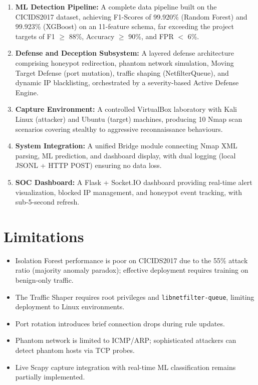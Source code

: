 \documentclass[12pt,a4paper]{report}
\begin{document}
\begin{enumerate}
    \item \textbf{ML Detection Pipeline:} A complete data pipeline built on the CICIDS2017 dataset, achieving F1-Scores of 99.920\% (Random Forest) and 99.923\% (XGBoost) on an 11-feature schema, far exceeding the project targets of F1 $\geq$ 88\%, Accuracy $\geq$ 90\%, and FPR $<$ 6\%.
    \item \textbf{Defense and Deception Subsystem:} A layered defense architecture comprising honeypot redirection, phantom network simulation, Moving Target Defense (port mutation), traffic shaping (NetfilterQueue), and dynamic IP blacklisting, orchestrated by a severity-based Active Defense Engine.
    \item \textbf{Capture Environment:} A controlled VirtualBox laboratory with Kali Linux (attacker) and Ubuntu (target) machines, producing 10 Nmap scan scenarios covering stealthy to aggressive reconnaissance behaviours.
    \item \textbf{System Integration:} A unified Bridge module connecting Nmap XML parsing, ML prediction, and dashboard display, with dual logging (local JSONL + HTTP POST) ensuring no data loss.
    \item \textbf{SOC Dashboard:} A Flask + Socket.IO dashboard providing real-time alert visualization, blocked IP management, and honeypot event tracking, with sub-5-second refresh.
\end{enumerate}

\section{Limitations}

\begin{itemize}
    \item Isolation Forest performance is poor on CICIDS2017 due to the 55\% attack ratio (majority anomaly paradox); effective deployment requires training on benign-only traffic.
    \item The Traffic Shaper requires root privileges and \texttt{libnetfilter-queue}, limiting deployment to Linux environments.
    \item Port rotation introduces brief connection drops during rule updates.
    \item Phantom network is limited to ICMP/ARP; sophisticated attackers can detect phantom hosts via TCP probes.
    \item Live Scapy capture integration with real-time ML classification remains partially implemented.
\end{itemize}
\end{document}
